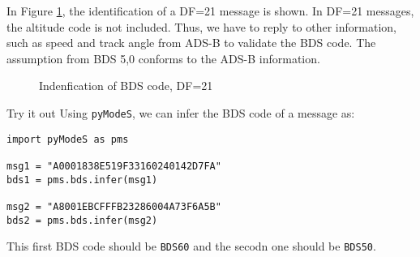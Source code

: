 In Figure \ref{fig:bds_bds_infer_example_2}, the identification of a DF=21 message is shown. In DF=21 messages, the altitude code is not included. Thus, we have to reply to other information, such as speed and track angle from ADS-B to validate the BDS code. The assumption from BDS 5,0 conforms to the ADS-B information.

\begin{figure}[ht]
\centering

\caption{Indenfication of BDS code, DF=21}
\label{fig:bds_bds_infer_example_2}
\end{figure}

\begin{notebox}{Try it out}
Using \texttt{pyModeS}, we can infer the BDS code of a message as: 

\begin{verbatim}
import pyModeS as pms

msg1 = "A0001838E519F33160240142D7FA"
bds1 = pms.bds.infer(msg1)

msg2 = "A8001EBCFFFB23286004A73F6A5B"
bds2 = pms.bds.infer(msg2)
\end{verbatim}

This first BDS code should be \texttt{BDS60} and the secodn one should be \texttt{BDS50}.

\end{notebox}
